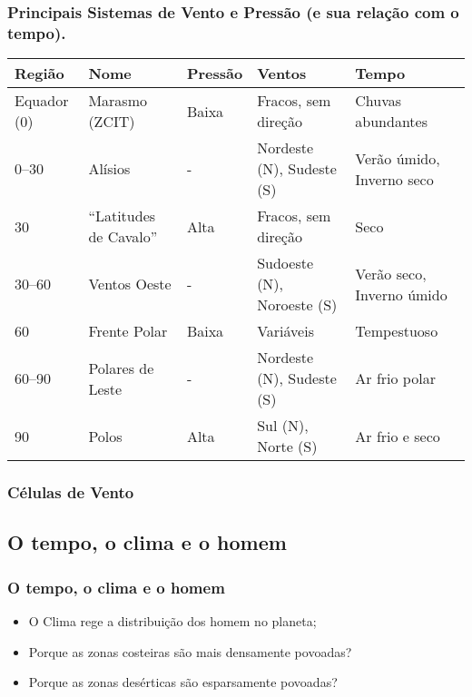 \begin{frame}
\frametitle{Principais Sistemas de Vento e Pressão (e sua relação com o tempo).}
{\tiny
\begin{table}
    \begin{tabular}{lllll}
    Região                           & Nome                     & Pressão & Ventos                     & Tempo                     \\
        \hline
    Equador (0\textdegree{})         & Marasmo (ZCIT)           & Baixa   & Fracos, sem direção        & Chuvas abundantes         \\
    0\textdegree{}--30\textdegree{}  & Alísios                  & -       & Nordeste (N), Sudeste (S)  & Verão úmido, Inverno seco \\
    30\textdegree{}                  & ``Latitudes de Cavalo''  & Alta    & Fracos, sem direção        & Seco                      \\
    30\textdegree{}--60\textdegree{} & Ventos Oeste             & -       & Sudoeste (N), Noroeste (S) & Verão seco, Inverno úmido \\
    60\textdegree{}                  & Frente Polar             & Baixa   & Variáveis                  & Tempestuoso               \\
    60\textdegree{}--90\textdegree{} & Polares de Leste         & -       & Nordeste (N), Sudeste (S)  & Ar frio polar             \\
    90\textdegree{}                  & Polos                    & Alta    & Sul (N), Norte (S)         & Ar frio e seco            \\
    \hline
    \end{tabular}
\end{table}
}
\end{frame}


\begin{frame}
\frametitle{Células de Vento}
  \begin{center}
  \end{center}
\end{frame}


\subsection{O tempo, o clima e o homem}
\begin{frame}
\frametitle{O tempo, o clima e o homem}
  \begin{itemize}[<+-| alert@+>]
    \item O Clima rege a distribuição dos homem no planeta;
    \item Porque as zonas costeiras são mais densamente povoadas?
    \item Porque as zonas desérticas são esparsamente povoadas?
\end{itemize}
\end{frame}


